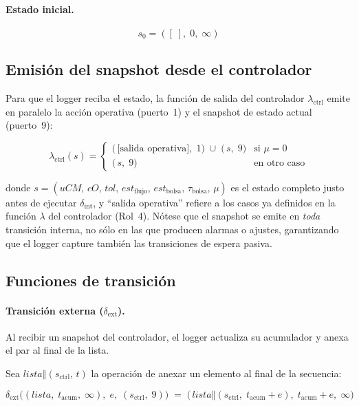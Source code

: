 \documentclass{article}
\newcommand{\dint}{\delta_{\mathrm{int}}}
\newcommand{\dext}{\delta_{\mathrm{ext}}}
\begin{document}
\paragraph{Estado inicial.}
\[
  s_0 = ([\;],\; 0,\; \infty)
\]

\subsection{Emisión del snapshot desde el controlador}

Para que el logger reciba el estado, la función de salida del controlador
$\lambda_{\mathrm{ctrl}}$ emite en paralelo la acción operativa (puerto~1) y
el snapshot de estado actual (puerto~9):

\[
  \lambda_{\mathrm{ctrl}}(s) =
  \begin{cases}
    \bigl(\,\text{[salida operativa]},\;1\bigr)
    \;\cup\;
    \bigl(\,s,\;9\bigr)
    & \text{si } \mu = 0
    \\[6pt]
    \bigl(\,s,\;9\bigr)
    & \text{en otro caso}
  \end{cases}
\]

\noindent
donde $s = (uCM,\,cO,\,tol,\,est_{\mathrm{flujo}},\,est_{\mathrm{bolsa}},
\,\tau_{\mathrm{bolsa}},\,\mu)$ es el estado completo justo antes de ejecutar
$\dint$, y ``salida operativa'' refiere a los casos ya definidos en la
función $\lambda$ del controlador (Rol~4). Nótese que el snapshot se emite
en \emph{toda} transición interna, no sólo en las que producen alarmas o
ajustes, garantizando que el logger capture también las transiciones de
espera pasiva.

\subsection{Funciones de transición}

\paragraph{Transición externa ($\dext$).}
Al recibir un snapshot del controlador, el logger actualiza su acumulador
y anexa el par al final de la lista.

Sea $\mathit{lista} \mathbin{\Vert} (s_{\mathrm{ctrl}},\, t)$ la operación de
anexar un elemento al final de la secuencia:

\[
  \dext\bigl((\mathit{lista},\; t_{\mathrm{acum}},\; \infty),\;
             e,\;
             (s_{\mathrm{ctrl}},\; 9)\bigr)
  \;=\;
  \bigl(\,
    \mathit{lista} \mathbin{\Vert} (s_{\mathrm{ctrl}},\; t_{\mathrm{acum}} + e),\;
    t_{\mathrm{acum}} + e,\;
    \infty
  \bigr)
\]
\end{document}
